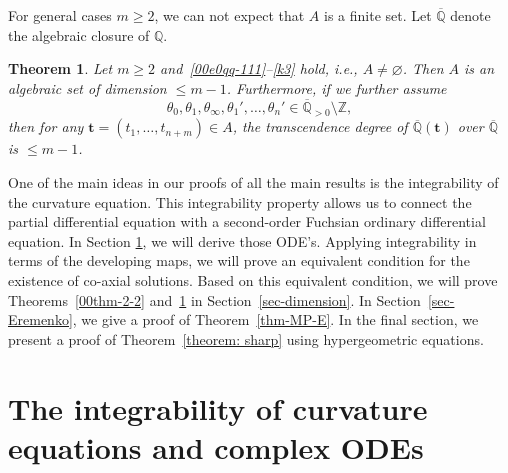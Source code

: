 \documentclass[10pt,a4paper]{amsart}
\numberwithin{equation}{section}
\newtheorem{Theorem}{Theorem}[section]
\def\Q{\mathbb Q}
\begin{document}
For general cases $m\geq 2$, we can not expect that $A$ is a finite
set. Let $\overline{\mathbb Q}$ denote the algebraic closure of $\mathbb{Q}$.

\begin{Theorem}\label{00thm-2-1}
Let $m\geq 2$ and~\eqref{00e0qq-111}--\eqref{k3} hold,
i.e., $A\neq\varnothing$. Then $A$ is an algebraic set of dimension $\leq
m-1$. Furthermore, if we further assume
\begin{equation} \label{000eq: theta alpha a}
 \theta_0,\theta_1,\theta_\infty,\theta_1',\dots,\theta_n'
 \in \overline{\Q}_{>0}\setminus\mathbb{Z},
\end{equation}
then for any $\boldsymbol t=(t_1,\dots,t_{n+m})\in A$, the transcendence degree of
 $\overline{\Q}(\boldsymbol t)$ over $\overline{\Q}$ is $\le m-1$.
\end{Theorem}

One of the main ideas in our proofs of all the main results is the
integrability of the curvature equation. This integrability property
allows us to connect the partial differential equation with a
second-order Fuchsian ordinary differential equation. In Section
\ref{sec-MP-E}, we will derive those ODE's. Applying integrability in
terms of the developing maps, we will prove an equivalent condition
for the existence of co-axial solutions. Based on this equivalent
condition, we will prove Theorems~\ref{00thm-2-2} and~\ref{00thm-2-1}
in Section~\ref{sec-dimension}. In Section~\ref{sec-Eremenko}, we give
a proof of Theorem~\ref{thm-MP-E}. In the final section, we present a
proof of Theorem~\ref{theorem: sharp} using hypergeometric equations.

\section{The integrability of curvature equations and complex ODEs}

\label{sec-MP-E}
\end{document}
